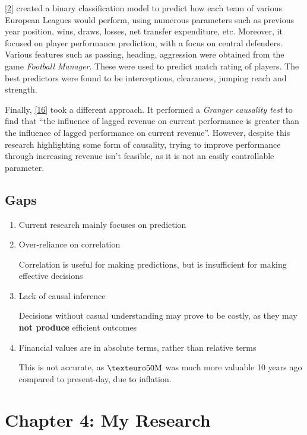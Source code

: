\documentclass[
  english,
  doc,floatsintext]{apa6}
\begin{document}
\protect\hyperlink{ref-chazan-pantzalisSportsAnalyticsAlgorithms2020}{{[}2{]}} created a binary classification model to predict how each team of various European Leagues would perform, using numerous parameters such as previous year position, wins, draws, losses, net transfer expenditure, etc. Moreover, it focused on player performance prediction, with a focus on central defenders. Various features such as passing, heading, aggression were obtained from the game \emph{Football Manager}. These were used to predict match rating of players. The best predictors were found to be interceptions, clearances, jumping reach and strength.

Finally, \protect\hyperlink{ref-dobsonPerformanceRevenueProfessional1998}{{[}16{]}} took a different approach. It performed a \emph{Granger causality test} to find that ``the influence of lagged revenue on current performance is greater than the influence of lagged performance on current revenue''. However, despite this research highlighting some form of causality, trying to improve performance through increasing revenue isn't feasible, as it is not an easily controllable parameter.

\hypertarget{gaps}{%
\subsection{Gaps}\label{gaps}}

\begin{enumerate}
\def\labelenumi{\arabic{enumi}.}
\item
  Current research mainly focuses on prediction
\item
  Over-reliance on correlation

  Correlation is useful for making predictions, but is insufficient for making effective decisions
\item
  Lack of causal inference

  Decisions without casual understanding may prove to be costly, as they may \textbf{not produce} efficient outcomes
\item
  Financial values are in absolute terms, rather than relative terms

  This is not accurate, as \(€ 50\rm{M}\) was much more valuable 10 years ago compared to present-day, due to inflation.
\end{enumerate}

\newpage

\hypertarget{chapter-4-my-research}{%
\section{Chapter 4: My Research}\label{chapter-4-my-research}}
\end{document}
